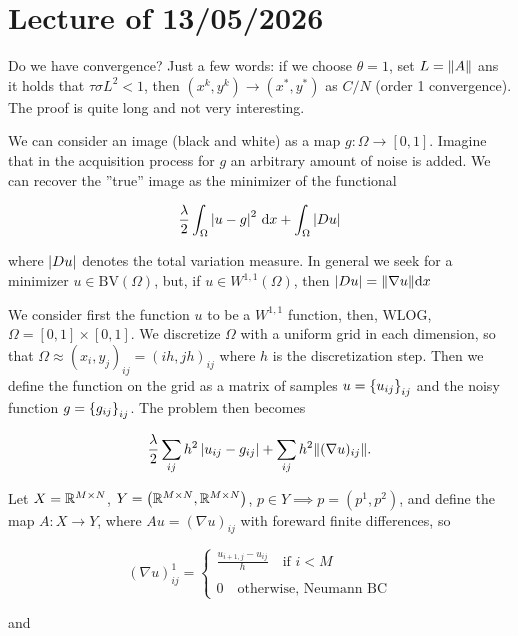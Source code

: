 \chapter{Lecture \thechapter{} of 13/05/2026}

Do we have convergence? Just a few words: if we choose $\theta = 1$, set $L = \lVert A \rVert$ ans it holds that $\tau \sigma L^2 < 1$, then $(x^k,y^k) \to (x^*,y^*)$ as $C/N$ (order 1 convergence). The proof is quite long and not very interesting.

\begin{example}

    We can consider an image (black and white) as a map $g : \Omega \to [0,1]$. Imagine that in the acquisition process for $g$ an arbitrary amount of noise is added. We can recover the ''true'' image as the minimizer of the functional 

    \[ \frac{\lambda}{2} \int_\Omega \left|u - g\right|^2 \, \mathrm{d} x + \int_\Omega \left|Du\right| \]

    where $\left|Du\right|$ denotes the total variation measure. In general we seek for a minimizer $u \in \mathrm{BV}(\Omega)$, but, if $u \in W^{1,1}(\Omega)$, then $\left|Du\right| = \lVert \nabla u \rVert\mathrm{d} x$

    We consider first the function $u$ to be a $W^{1,1}$ function, then, WLOG, $\Omega = [0,1] \times [0,1]$. We discretize $\Omega$ with a uniform grid in each dimension, so that $\Omega \approx (x_i,y_j)_{ij} = (ih,jh)_{ij}$ where $h$ is the discretization step. Then we define the function on the grid as a matrix of samples $u = \left\{ u_{ij} \right\}_{ij}$ and the noisy function $g = \left\{ g_{ij} \right\}_{ij}$. The problem then becomes 

    \[ \frac{\lambda}{2} \sum_{ij} h^2 \left|u_{ij} - g_{ij}\right| + \sum_{ij} h^2 \lVert (\nabla u)_{ij} \rVert. \]

    Let $X = \mathbb{R}^{M \times N}$, $Y = \left(\mathbb{R}^{M \times N}, \mathbb{R}^{M \times N}\right)$, $p \in Y \implies p = (p^1,p^2)$, and define the map $A : X \to Y$, where $Au = (\nabla u)_{ij}$ with foreward finite differences, so 

    \[ (\nabla u)_{ij}^1 = \begin{cases}
        \displaystyle\frac{u_{i+1,j} - u_{ij}}{h} \quad \text{if } i < M \\
        \\ 
        0 \quad\text{otherwise, Neumann BC}
    \end{cases}
    \]

    and 


\end{example}
